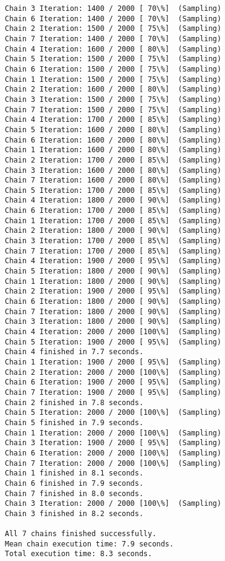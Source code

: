 \documentclass[11pt]{article}
\begin{document}
\begin{Verbatim}[commandchars=\\\{\}]
Chain 3 Iteration: 1400 / 2000 [ 70\%]  (Sampling)
Chain 6 Iteration: 1400 / 2000 [ 70\%]  (Sampling)
Chain 2 Iteration: 1500 / 2000 [ 75\%]  (Sampling)
Chain 7 Iteration: 1400 / 2000 [ 70\%]  (Sampling)
Chain 4 Iteration: 1600 / 2000 [ 80\%]  (Sampling)
Chain 5 Iteration: 1500 / 2000 [ 75\%]  (Sampling)
Chain 6 Iteration: 1500 / 2000 [ 75\%]  (Sampling)
Chain 1 Iteration: 1500 / 2000 [ 75\%]  (Sampling)
Chain 2 Iteration: 1600 / 2000 [ 80\%]  (Sampling)
Chain 3 Iteration: 1500 / 2000 [ 75\%]  (Sampling)
Chain 7 Iteration: 1500 / 2000 [ 75\%]  (Sampling)
Chain 4 Iteration: 1700 / 2000 [ 85\%]  (Sampling)
Chain 5 Iteration: 1600 / 2000 [ 80\%]  (Sampling)
Chain 6 Iteration: 1600 / 2000 [ 80\%]  (Sampling)
Chain 1 Iteration: 1600 / 2000 [ 80\%]  (Sampling)
Chain 2 Iteration: 1700 / 2000 [ 85\%]  (Sampling)
Chain 3 Iteration: 1600 / 2000 [ 80\%]  (Sampling)
Chain 7 Iteration: 1600 / 2000 [ 80\%]  (Sampling)
Chain 5 Iteration: 1700 / 2000 [ 85\%]  (Sampling)
Chain 4 Iteration: 1800 / 2000 [ 90\%]  (Sampling)
Chain 6 Iteration: 1700 / 2000 [ 85\%]  (Sampling)
Chain 1 Iteration: 1700 / 2000 [ 85\%]  (Sampling)
Chain 2 Iteration: 1800 / 2000 [ 90\%]  (Sampling)
Chain 3 Iteration: 1700 / 2000 [ 85\%]  (Sampling)
Chain 7 Iteration: 1700 / 2000 [ 85\%]  (Sampling)
Chain 4 Iteration: 1900 / 2000 [ 95\%]  (Sampling)
Chain 5 Iteration: 1800 / 2000 [ 90\%]  (Sampling)
Chain 1 Iteration: 1800 / 2000 [ 90\%]  (Sampling)
Chain 2 Iteration: 1900 / 2000 [ 95\%]  (Sampling)
Chain 6 Iteration: 1800 / 2000 [ 90\%]  (Sampling)
Chain 7 Iteration: 1800 / 2000 [ 90\%]  (Sampling)
Chain 3 Iteration: 1800 / 2000 [ 90\%]  (Sampling)
Chain 4 Iteration: 2000 / 2000 [100\%]  (Sampling)
Chain 5 Iteration: 1900 / 2000 [ 95\%]  (Sampling)
Chain 4 finished in 7.7 seconds.
Chain 1 Iteration: 1900 / 2000 [ 95\%]  (Sampling)
Chain 2 Iteration: 2000 / 2000 [100\%]  (Sampling)
Chain 6 Iteration: 1900 / 2000 [ 95\%]  (Sampling)
Chain 7 Iteration: 1900 / 2000 [ 95\%]  (Sampling)
Chain 2 finished in 7.8 seconds.
Chain 5 Iteration: 2000 / 2000 [100\%]  (Sampling)
Chain 5 finished in 7.9 seconds.
Chain 1 Iteration: 2000 / 2000 [100\%]  (Sampling)
Chain 3 Iteration: 1900 / 2000 [ 95\%]  (Sampling)
Chain 6 Iteration: 2000 / 2000 [100\%]  (Sampling)
Chain 7 Iteration: 2000 / 2000 [100\%]  (Sampling)
Chain 1 finished in 8.1 seconds.
Chain 6 finished in 7.9 seconds.
Chain 7 finished in 8.0 seconds.
Chain 3 Iteration: 2000 / 2000 [100\%]  (Sampling)
Chain 3 finished in 8.2 seconds.

All 7 chains finished successfully.
Mean chain execution time: 7.9 seconds.
Total execution time: 8.3 seconds.

    \end{Verbatim}
\end{document}

